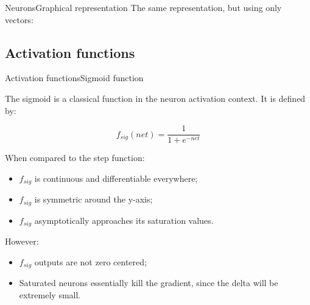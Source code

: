 \documentclass{beamer}
\begin{document}
    \begin{frame}{Neurons}{Graphical representation}
        The same representation, but using only vectors:

        \begin{figure}
            \centering
        \end{figure}
    \end{frame}

    \subsection{Activation functions}

        \begin{frame}{Activation functions}{Sigmoid function}
            
            The sigmoid is a classical function in the neuron activation context. It is defined by:

            \begin{displaymath}
                f_{sig}(net) = \frac{1}{1 + e^{-net}}
            \end{displaymath}

            When compared to the step function:
            \begin{itemize}
                \item $f_{sig}$ is continuous and differentiable everywhere;
                \item $f_{sig}$ is symmetric around the y-axis;
                \item $f_{sig}$ asymptotically approaches its saturation values.
            \end{itemize}

            However:
            \begin{itemize}
                \item $f_{sig}$ outputs are not zero centered;
                \item Saturated neurons essentially kill the gradient, since the delta will be extremely small.
            \end{itemize}
        \end{frame}
\end{document}
